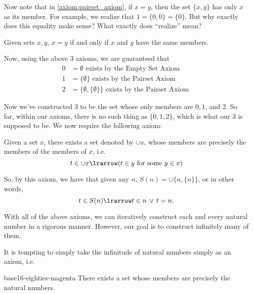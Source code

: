 \documentclass[notoc,notitlepage]{tufte-book}
\begin{document}
Now note that in \cref{axiom:pairset_axiom}, if $x = y$, then the set $\{x, y\}$ has only $x$ as its member. For example, we realize that $1 = \{ 0, 0 \} = \{ 0 \}$. But why exactly does this equality make sense? What exactly does ``realize'' mean?

\begin{axiom}
\label{axiom:axiom_of_extension}
  Given sets $x, y$, $x = y$ if and only if $x$ and $y$ have the same members.
\end{axiom}

Now, using the above 3 axioms, we are guaranteed that
\begin{align*}
  0 &= \emptyset \text{ exists by the Empty Set Axiom } \\
  1 &= \{ \emptyset \} \text{ exists by the Pairset Axiom } \\
  2 &= \{ \emptyset, \{ \emptyset \} \} \text{ exists by the Pairset Axiom }
\end{align*}

Now we've constructed $3$ to be the set whose only members are $0, 1$, and $2$. So far, within our axioms, there is no such thing as $\{0, 1, 2\}$, which is what our $3$ is supposed to be. We now require the following axiom:

\begin{axiom}
\label{axiom:union_set_axiom}
  Given a set $x$, there exists a set denoted by $\cup x$, whose members are precisely the members of the members of $x$, i.e.
  \begin{equation*}
    t \in \cup x \lrarrow ( t \in y \text{ for some } y \in x )
  \end{equation*}
\end{axiom}

So, by this axiom, we have that given any $n$, $S(n) = \cup \{ n, \{ n \} \}$, or in other words,
\begin{equation*}
  t \in S(n) \lrarrow t \in n \, \lor \, t = n.
\end{equation*}

With all of the above axioms, we can iteratively construct each and every natural number in a rigorous manner. However, our goal is to construct infinitely many of them.

It is tempting to simply take the infinitude of natural numbers simply as an axiom, i.e.

\begin{quotebox}{base16-eighties-magenta}\label{sp:natural_numbers_axiom}
  There exists a set whose members are precisely the natural numbers.
\end{quotebox}
\end{document}
